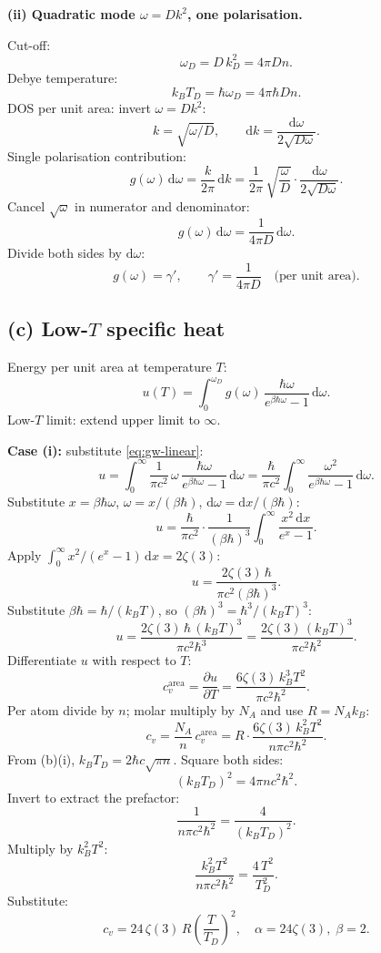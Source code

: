 \documentclass[11pt]{article}
\newcommand{\de}{\mathrm{d}}
\newcommand{\pd}[2]{\frac{\partial #1}{\partial #2}}
\begin{document}
\textbf{(ii) Quadratic mode $\omega=Dk^2$, one polarisation.}

Cut-off:
\[
\omega_D = D\,k_D^2 = 4\pi D n.
\]
Debye temperature:
\[
\boxed{\;k_B T_D = \hbar\omega_D = 4\pi\hbar D n.\;}
\]
DOS per unit area: invert $\omega = Dk^2$:
\[
k = \sqrt{\omega/D},\qquad \de k = \frac{\de\omega}{2\sqrt{D\omega}}.
\]
Single polarisation contribution:
\[
g(\omega)\,\de\omega = \frac{k}{2\pi}\,\de k = \frac{1}{2\pi}\,\sqrt{\frac{\omega}{D}}\cdot\frac{\de\omega}{2\sqrt{D\omega}}.
\]
Cancel $\sqrt{\omega}$ in numerator and denominator:
\[
g(\omega)\,\de\omega = \frac{1}{4\pi D}\,\de\omega.
\]
Divide both sides by $\de\omega$:
\begin{equation}
\boxed{\;g(\omega) = \gamma',\qquad \gamma' = \frac{1}{4\pi D}\quad\text{(per unit area)}.\;}
\label{eq:gw-quad}
\end{equation}

\subsection*{(c) Low-$T$ specific heat}

Energy per unit area at temperature $T$:
\[
u(T) = \int_0^{\omega_D}\!\!g(\omega)\,\frac{\hbar\omega}{e^{\beta\hbar\omega}-1}\,\de\omega.
\]
Low-$T$ limit: extend upper limit to $\infty$.

\textbf{Case (i):} substitute \eqref{eq:gw-linear}:
\[
u = \int_0^\infty\!\frac{1}{\pi c^2}\,\omega\,\frac{\hbar\omega}{e^{\beta\hbar\omega}-1}\,\de\omega = \frac{\hbar}{\pi c^2}\int_0^\infty\!\frac{\omega^2}{e^{\beta\hbar\omega}-1}\,\de\omega.
\]
Substitute $x=\beta\hbar\omega$, $\omega = x/(\beta\hbar)$, $\de\omega = \de x/(\beta\hbar)$:
\[
u = \frac{\hbar}{\pi c^2}\cdot\frac{1}{(\beta\hbar)^3}\int_0^\infty\!\frac{x^2\,\de x}{e^x-1}.
\]
Apply $\int_0^\infty x^2/(e^x-1)\,\de x = 2\zeta(3)$:
\[
u = \frac{2\zeta(3)\,\hbar}{\pi c^2 (\beta\hbar)^3}.
\]
Substitute $\beta\hbar = \hbar/(k_BT)$, so $(\beta\hbar)^3 = \hbar^3/(k_BT)^3$:
\[
u = \frac{2\zeta(3)\,\hbar\,(k_BT)^3}{\pi c^2 \hbar^3} = \frac{2\zeta(3)\,(k_B T)^3}{\pi c^2 \hbar^2}.
\]
Differentiate $u$ with respect to $T$:
\[
c_v^\text{area} = \pd{u}{T} = \frac{6\zeta(3)\,k_B^3 T^2}{\pi c^2 \hbar^2}.
\]
Per atom divide by $n$; molar multiply by $N_A$ and use $R = N_A k_B$:
\[
c_v = \frac{N_A}{n}\,c_v^\text{area} = R\cdot\frac{6\zeta(3)\,k_B^2 T^2}{n\pi c^2\hbar^2}.
\]
From (b)(i), $k_B T_D = 2\hbar c\sqrt{\pi n}$. Square both sides:
\[
(k_B T_D)^2 = 4\pi n c^2\hbar^2.
\]
Invert to extract the prefactor:
\[
\frac{1}{n\pi c^2\hbar^2} = \frac{4}{(k_B T_D)^2}.
\]
Multiply by $k_B^2 T^2$:
\[
\frac{k_B^2 T^2}{n\pi c^2\hbar^2} = \frac{4\,T^2}{T_D^2}.
\]
Substitute:
\[
\boxed{\;c_v = 24\,\zeta(3)\,R\!\left(\frac{T}{T_D}\right)^2,\quad \alpha=24\zeta(3),\;\beta=2.\;}
\]
\end{document}
